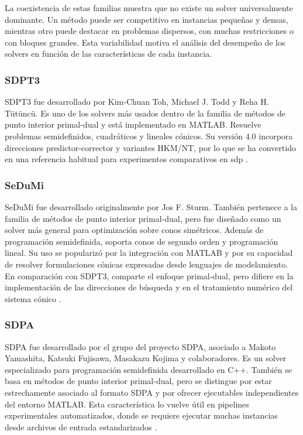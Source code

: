La coexistencia de estas familias muestra que no existe un solver universalmente dominante. Un
método puede ser competitivo en instancias pequeñas y densas, mientras otro puede destacar en
problemas dispersos, con muchas restricciones o con bloques grandes. Esta variabilidad motiva el
análisis del desempeño de los solvers en función de las características de cada
instancia.

\newpage
\subsubsection{SDPT3}
\label{subsec:solver_sdpt3}

SDPT3 fue desarrollado por Kim-Chuan Toh, Michael J. Todd y Reha H. Tütüncü. Es uno de los
solvers más usados dentro de la familia de métodos de punto interior primal-dual y está
implementado en MATLAB. Resuelve problemas semidefinidos, cuadráticos y lineales cónicos. Su
versión 4.0 incorpora direcciones predictor-corrector y variantes HKM/NT, por lo que se ha
convertido en una referencia habitual para experimentos comparativos en \acrshort{sdp}
\cite{tohImplementationUsageSDPT32012a}.

\subsubsection{SeDuMi}
\label{subsec:solver_sedumi}

SeDuMi fue desarrollado originalmente por Jos F. Sturm. También pertenece a la familia de
métodos de punto interior primal-dual, pero fue diseñado como un solver más general para
optimización sobre conos simétricos. Además de programación semidefinida, soporta conos de
segundo orden y programación lineal. Su uso se popularizó por la integración con MATLAB y por
su capacidad de resolver formulaciones cónicas expresadas desde lenguajes de modelamiento. En
comparación con SDPT3, comparte el enfoque primal-dual, pero difiere en la implementación de
las direcciones de búsqueda y en el tratamiento numérico del sistema cónico
\cite{sturmUSINGSEDUMI1022001}.

\subsubsection{SDPA}
\label{subsec:solver_sdpa}

SDPA fue desarrollado por el grupo del proyecto SDPA, asociado a Makoto Yamashita, Katsuki
Fujisawa, Masakazu Kojima y colaboradores. Es un solver especializado para programación
semidefinida desarrollado en C++. También se basa en métodos de punto interior primal-dual,
pero se distingue por estar estrechamente asociado al formato SDPA y por ofrecer ejecutables
independientes del entorno MATLAB. Esta característica lo vuelve útil en pipelines experimentales
automatizados, donde se requiere ejecutar muchas instancias desde archivos de entrada
estandarizados \cite{SDPAOfficialPage}.


